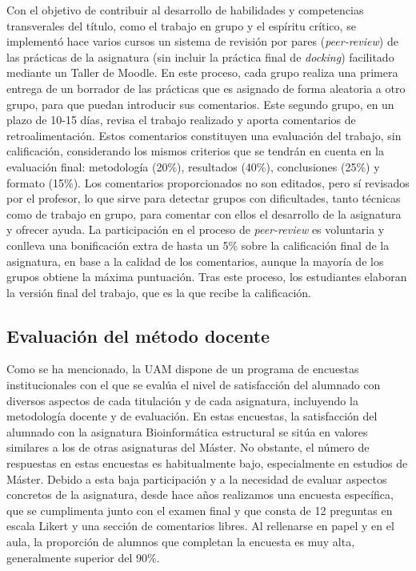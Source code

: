 \documentclass[
  11pt,
  a4paper,
  twoside]{scrreprt}
\begin{document}
Con el objetivo de contribuir al desarrollo de habilidades y
competencias transverales del título, como el trabajo en grupo y el
espíritu crítico, se implementó hace varios cursos un sistema de
revisión por pares (\emph{peer-review}) de las prácticas de la
asignatura (sin incluir la práctica final de \emph{docking}) facilitado
mediante un Taller de Moodle. En este proceso, cada grupo realiza una
primera entrega de un borrador de las prácticas que es asignado de forma
aleatoria a otro grupo, para que puedan introducir sus comentarios. Este
segundo grupo, en un plazo de 10-15 días, revisa el trabajo realizado y
aporta comentarios de retroalimentación. Estos comentarios constituyen
una evaluación del trabajo, sin calificación, considerando los mismos
criterios que se tendrán en cuenta en la evaluación final: metodología
(20\%), resultados (40\%), conclusiones (25\%) y formato (15\%). Los
comentarios proporcionados no son editados, pero sí revisados por el
profesor, lo que sirve para detectar grupos con dificultades, tanto
técnicas como de trabajo en grupo, para comentar con ellos el desarrollo
de la asignatura y ofrecer ayuda. La participación en el proceso de
\emph{peer-review} es voluntaria y conlleva una bonificación extra de
hasta un 5\% sobre la calificación final de la asignatura, en base a la
calidad de los comentarios, aunque la mayoría de los grupos obtiene la
máxima puntuación. Tras este proceso, los estudiantes elaboran la
versión final del trabajo, que es la que recibe la calificación.

\subsection{Evaluación del método docente}\label{sec-evalStrBio}

Como se ha mencionado, la UAM dispone de un programa de encuestas
institucionales con el que se evalúa el nivel de satisfacción del
alumnado con diversos aspectos de cada titulación y de cada asignatura,
incluyendo la metodología docente y de evaluación. En estas encuestas,
la satisfacción del alumnado con la asignatura Bioinformática
estructural se sitúa en valores similares a los de otras asignaturas del
Máster. No obstante, el número de respuestas en estas encuestas es
habitualmente bajo, especialmente en estudios de Máster. Debido a esta
baja participación y a la necesidad de evaluar aspectos concretos de la
asignatura, desde hace años realizamos una encuesta específica, que se
cumplimenta junto con el examen final y que consta de 12 preguntas en
escala Likert y una sección de comentarios libres. Al rellenarse en
papel y en el aula, la proporción de alumnos que completan la encuesta
es muy alta, generalmente superior del 90\%.
\end{document}
